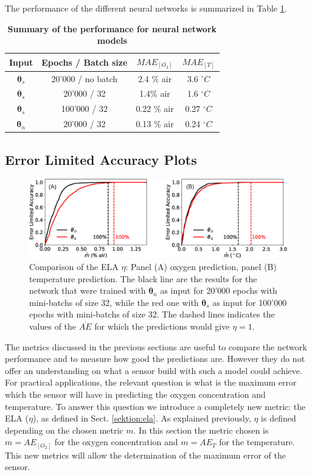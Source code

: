 \documentclass[9pt,twocolumn,twoside,pdftex]{optica}
\begin{document}
The performance of the different neural networks is summarized in Table \ref{TableMAE_summary}. 
\begin{table}[hbt]
\centering
\caption {\bf Summary of the performance for neural network models}

\begin{tabular}{ cccc}
\smallskip 
 Input & Epochs / Batch size & $MAE_{[O_2]}$ & $MAE_{[T]}$  \\ 
 \hline
${\pmb \theta}_s$ & 20'000 / \textrm{no batch} & 2.4 \% air & 3.6 $^\circ C$\\ 
${\pmb \theta}_s$ & 20'000 / 32 & 1.4\% air & 1.6 $^\circ C$\\ 
${\pmb \theta}_s$& 100'000 / 32 & 0.22 \% air & 0.27 $^\circ C$\\ 
${\pmb \theta}_n$ & 20'000 / 32 & 0.13 \% air & 0.24 $^\circ C$\\ 
\end{tabular}
\label{TableMAE_summary}
\end{table}

\subsection{Error Limited Accuracy Plots}

\begin{figure}[t!]
\centering
\includegraphics[width=15.5 cm]{ELA_comparison_O2_T.eps}
\caption{Comparison of the ELA $\eta$: Panel (A) oxygen prediction, panel (B) temperature prediction. The black line are the results for the network that were trained with ${\pmb \theta}_n$ as input for 20'000 epochs with mini-batchs of size 32, while the red one with ${\pmb \theta}_s$ as input for 100'000 epochs with mini-batchs of size 32. The dashed lines indicates the values of the $\overline{AE}$ for which the predictions would give $\eta=1$.}
\label{fig:ELA_result_comparison}
\end{figure}

The metrics discussed in the previous sections are useful to compare the network performance and to measure how good the predictions are. However they do not offer an understanding on what a sensor build with such a model could achieve. For practical applications, the relevant question is what is the maximum error which the sensor will have in predicting the oxygen concentration and temperature. To answer this question we introduce a completely new metric: the ELA ($\eta$), as defined in Sect. \ref{sektion:ela}. As explained previously, $\eta$ is defined depending on the chosen metric $m$. In this section the metric chosen is $m=AE_{[O_2]}$ for the oxygen concentration and $m=AE_{T}$ for the temperature. This new metrics will allow the determination of the maximum error of the sensor. 
\end{document}
